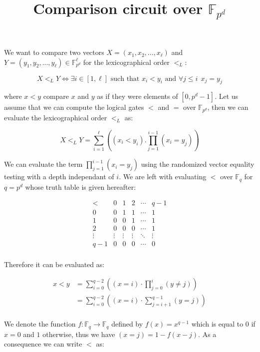 \documentclass[a4paper,11pt]{article}
\title{Comparison circuit over $\mathbb{F}_{p^d}$}
\date{}
\author{}
\theoremstyle{definition}
\begin{document}
\maketitle

We want to compare two vectors $X=(x_1,x_2,\ldots,x_\ell)$ and $Y=(y_1,y_2,\ldots,y_\ell)\in\mathbb{F}_{p^d}^\ell$ for the lexicographical order $<_L$:

$$X <_L Y \Leftrightarrow \exists i\in[1,\ell] \text{ such that } x_i < y_i \text{ and } \forall j\leq i ~~ x_j = y_j $$

where $x<y$ compare $x$ and $y$ as if they were elements of $[0,p^d-1]$. Let us assume that we can compute the logical gates $<$ and $=$ over $\mathbb{F}_{p^d}$, then we can evaluate the lexicographical order $<_L$ as: 

$$ X <_L Y = \sum_{i=1}^\ell \left( (x_i < y_i).\prod_{j=1}^{i-1} (x_i = y_j) \right)$$

We can evaluate the term $\prod_{j=1}^{i-1} (x_i = y_j)$ using the randomized vector equality testing with a depth independant of $i$. We are left with evaluating $<$ over $\mathbb{F}_q$ for $q=p^d$ whose truth table is given hereafter:

$$
\begin{array}{c|ccccc}
  < & 0 & 1 & 2 & \cdots & q-1 \\
  \hline
  0 & 0 & 1 & 1 & \cdots & 1 \\
  1 & 0 & 0 & 1 & \cdots & 1 \\
  2 & 0 & 0 & 0 & \cdots & 1 \\
  \vdots & \vdots & \vdots & \vdots & \ddots & \vdots \\
  q-1 & 0 & 0 & 0 & \cdots & 0 \\
\end{array}
$$

Therefore it can be evaluated as:

\begin{align*}
  x < y & = \sum_{i=0}^{q-2} \left( (x = i)\cdot \prod_{j=0}^i (y \neq j) \right) \\
        & = \sum_{i=0}^{q-2} \left( (x = i)\cdot \sum_{j=i+1}^{q-1} (y = j) \right) \\
\end{align*}

We denote the function $f: \mathbb{F}_q \rightarrow \mathbb{F}_q$ defined by $f(x) = x^{q-1}$ which is equal to $0$ if $x = 0$ and $1$ otherwise, thus we have $(x = j) = 1-f(x-j)$. As a consequence we can write $<$ as:
\end{document}
